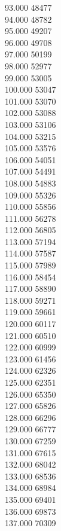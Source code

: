 { 93.000	48477 \\
 94.000	48782 \\
 95.000	49207 \\
 96.000	49708 \\
 97.000	50199 \\
 98.000	52977 \\
 99.000	53005 \\
 100.000	53047 \\
 101.000	53070 \\
 102.000	53088 \\
 103.000	53106 \\
 104.000	53215 \\
 105.000	53576 \\
 106.000	54051 \\
 107.000	54491 \\
 108.000	54883 \\
 109.000	55326 \\
 110.000	55856 \\
 111.000	56278 \\
 112.000	56805 \\
 113.000	57194 \\
 114.000	57587 \\
 115.000	57989 \\
 116.000	58454 \\
 117.000	58890 \\
 118.000	59271 \\
 119.000	59661 \\
 120.000	60117 \\
 121.000	60510 \\
 122.000	60999 \\
 123.000	61456 \\
 124.000	62326 \\
 125.000	62351 \\
 126.000	65350 \\
 127.000	65826 \\
 128.000	66296 \\
 129.000	66777 \\
 130.000	67259 \\
 131.000	67615 \\
 132.000	68042 \\
 133.000	68536 \\
 134.000	68984 \\
 135.000	69401 \\
 136.000	69873 \\
 137.000	70309 \\
}
